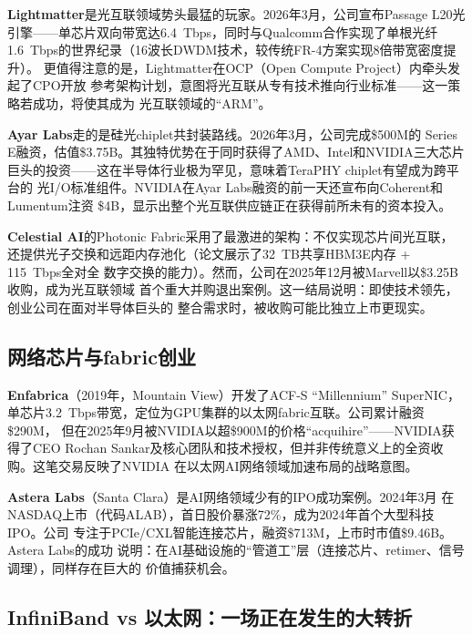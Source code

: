 \textbf{Lightmatter}是光互联领域势头最猛的玩家。2026年3月，公司宣布Passage
L20光引擎——单芯片双向带宽达6.4~Tbps，同时与Qualcomm合作实现了单根光纤
1.6~Tbps的世界纪录（16波长DWDM技术，较传统FR-4方案实现8倍带宽密度提升）。
更值得注意的是，Lightmatter在OCP（Open Compute Project）内牵头发起了CPO开放
参考架构计划，意图将光互联从专有技术推向行业标准——这一策略若成功，将使其成为
光互联领域的``ARM''。

\textbf{Ayar Labs}走的是硅光chiplet共封装路线。2026年3月，公司完成\$500M的
Series E融资，估值\$3.75B。其独特优势在于同时获得了AMD、Intel和NVIDIA三大芯片
巨头的投资——这在半导体行业极为罕见，意味着TeraPHY chiplet有望成为跨平台的
光I/O标准组件。NVIDIA在Ayar Labs融资的前一天还宣布向Coherent和Lumentum注资
\$4B，显示出整个光互联供应链正在获得前所未有的资本投入。

\textbf{Celestial AI}的Photonic Fabric采用了最激进的架构：不仅实现芯片间光互联，
还提供光子交换和远距内存池化（论文展示了32~TB共享HBM3E内存 + 115~Tbps全对全
数字交换的能力）。然而，公司在2025年12月被Marvell以\$3.25B收购，成为光互联领域
首个重大并购退出案例。这一结局说明：即使技术领先，创业公司在面对半导体巨头的
整合需求时，被收购可能比独立上市更现实。

\subsection{网络芯片与fabric创业}

\textbf{Enfabrica}（2019年，Mountain View）开发了ACF-S ``Millennium'' SuperNIC，
单芯片3.2~Tbps带宽，定位为GPU集群的以太网fabric互联。公司累计融资\$290M，
但在2025年9月被NVIDIA以超\$900M的价格``acquihire''——NVIDIA获得了CEO Rochan
Sankar及核心团队和技术授权，但并非传统意义上的全资收购。这笔交易反映了NVIDIA
在以太网AI网络领域加速布局的战略意图。

\textbf{Astera Labs}（Santa Clara）是AI网络领域少有的IPO成功案例。2024年3月
在NASDAQ上市（代码ALAB），首日股价暴涨72\%，成为2024年首个大型科技IPO。公司
专注于PCIe/CXL智能连接芯片，融资\$713M，上市时市值\$9.46B。Astera Labs的成功
说明：在AI基础设施的``管道工''层（连接芯片、retimer、信号调理），同样存在巨大的
价值捕获机会。

\subsection{InfiniBand vs 以太网：一场正在发生的大转折}

